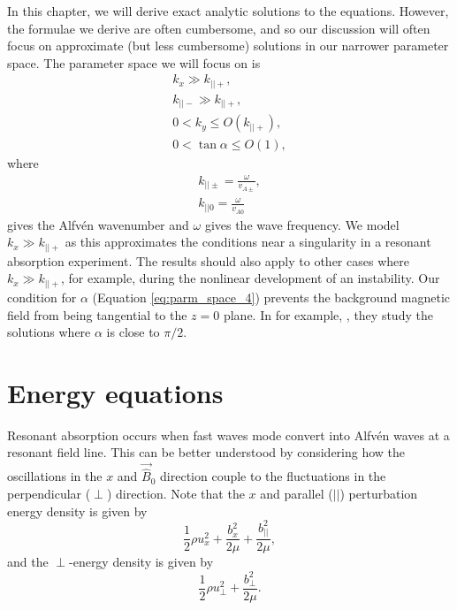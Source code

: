In this chapter, we will derive exact analytic solutions to the equations. However, the formulae we derive are often cumbersome, and so our discussion will often focus on approximate (but less cumbersome) solutions in our narrower parameter space. The parameter space we will focus on is
\begin{gather}
    \label{eq:parm_space_1}
    k_x \gg k_{||+}, \\
     \label{eq:parm_space_2}
    k_{||-} \gg k_{||+}, \\
    \label{eq:parm_space_ky}
    0 < k_y \le O(k_{||+}), \\
    \label{eq:parm_space_4}
    0 < \tan\alpha \le O(1), 
\end{gather}
where 
\begin{gather}
    \label{eq:k_par_pm}
    k_{||\pm} = \frac{\omega}{v_{A\pm}}, \\
    \label{eq:k_par0}
    k_{||0} = \frac{\omega}{v_{A0}}
\end{gather}
gives the Alfv\'en wavenumber and $\omega$ gives the wave frequency. We model $k_x\gg k_{||+}$ as this approximates the conditions near a singularity in a resonant absorption experiment. The results should also apply to other cases where $k_x\gg k_{||+}$, for example, during the nonlinear development of an instability. Our condition for $\alpha$ (Equation \ref{eq:parm_space_4}) prevents the background magnetic field from being tangential to the $z=0$ plane. In for example, \citet{Vickers2018,Vickers2020}, they study the solutions where $\alpha$ is close to $\pi/2$.


\section{Energy equations}
\label{sec:chap_4_energy_equations}

Resonant absorption occurs when fast waves mode convert into Alfv\'en waves at a resonant field line. This can be better understood by considering how the oscillations in the $x$ and $\vec{\hat{B}}_0$ direction couple to the fluctuations in the perpendicular ($\perp$) direction. Note that the $x$ and parallel ($||$) perturbation energy density is given by
\[\frac{1}{2}\rho u_x^2 + \frac{b_x^2}{2\mu} + \frac{b_{||}^2}{2\mu},\]
and the $\perp$-energy density is given by
\[\frac{1}{2}\rho u_\perp^2 + \frac{b_\perp^2}{2\mu} .\]

